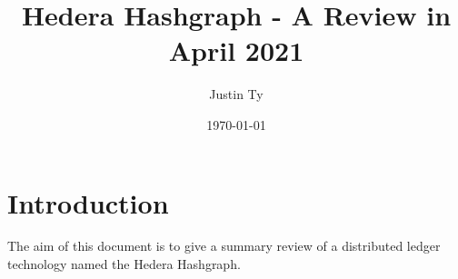 \documentclass{article}
\begin{document}
\author{Justin Ty}
\title{Hedera Hashgraph - A Review in April 2021 }
\date{\today}

\maketitle
\section{Introduction}
The aim of this document is to give a summary review of a distributed ledger technology named the Hedera Hashgraph.
\end{document}
